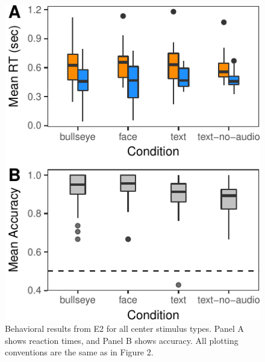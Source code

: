 \documentclass[10pt, letterpaper]{article}
\newenvironment{CodeChunk}{}{}
\begin{document}
\begin{CodeChunk}
\begin{figure}[t]

{\centering \includegraphics{figs/e2_plot_print-1} 

}

\caption[Behavioral results from E2 for all center stimulus types]{Behavioral results from E2 for all center stimulus types. Panel A shows reaction times, and Panel B shows accuracy. All plotting conventions are the same as in Figure 2.}\label{fig:e2_plot_print}
\end{figure}
\end{CodeChunk}
\end{document}
